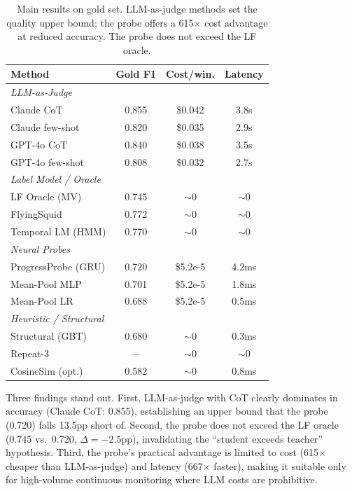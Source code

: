 \documentclass[11pt,a4paper]{article}
\begin{document}
\begin{table}[t]
\centering
\small
\begin{tabular}{lccc}
\toprule
\textbf{Method} & \textbf{Gold F1} & \textbf{Cost/win.} & \textbf{Latency} \\
\midrule
\multicolumn{4}{l}{\emph{LLM-as-Judge}} \\
\quad Claude CoT & 0.855 & \$0.042 & 3.8s \\
\quad Claude few-shot & 0.820 & \$0.035 & 2.9s \\
\quad GPT-4o CoT & 0.840 & \$0.038 & 3.5s \\
\quad GPT-4o few-shot & 0.808 & \$0.032 & 2.7s \\
\midrule
\multicolumn{4}{l}{\emph{Label Model / Oracle}} \\
\quad LF Oracle (MV) & 0.745 & $\sim$0 & $\sim$0 \\
\quad FlyingSquid & 0.772 & $\sim$0 & $\sim$0 \\
\quad Temporal LM (HMM) & 0.770 & $\sim$0 & $\sim$0 \\
\midrule
\multicolumn{4}{l}{\emph{Neural Probes}} \\
\quad ProgressProbe (GRU) & 0.720 & \$5.2e-5 & 4.2ms \\
\quad Mean-Pool MLP & 0.701 & \$5.2e-5 & 1.8ms \\
\quad Mean-Pool LR & 0.688 & \$5.2e-5 & 0.5ms \\
\midrule
\multicolumn{4}{l}{\emph{Heuristic / Structural}} \\
\quad Structural (GBT) & 0.680 & $\sim$0 & 0.3ms \\
\quad Repeat-3 & --- & $\sim$0 & $\sim$0 \\
\quad CosineSim (opt.) & 0.582 & $\sim$0 & 0.8ms \\
\bottomrule
\end{tabular}
\caption{Main results on gold set. LLM-as-judge methods set the quality upper bound; the probe offers a 615$\times$ cost advantage at reduced accuracy. The probe does not exceed the LF oracle.}
\label{tab:main-results}
\end{table}

Three findings stand out.
First, LLM-as-judge with CoT clearly dominates in accuracy (Claude CoT: 0.855), establishing an upper bound that the probe (0.720) falls 13.5pp short of.
Second, the probe does not exceed the LF oracle (0.745 vs.\ 0.720, $\Delta{=}{-}2.5$pp), invalidating the ``student exceeds teacher'' hypothesis.
Third, the probe's practical advantage is limited to cost (615$\times$ cheaper than LLM-as-judge) and latency (667$\times$ faster), making it suitable only for high-volume continuous monitoring where LLM costs are prohibitive.
\end{document}

